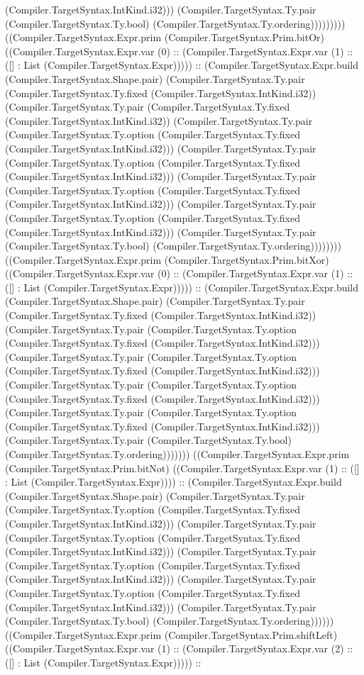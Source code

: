 \documentclass[11pt]{article}
\begin{document}
(Compiler.TargetSyntax.IntKind.i32))) (Compiler.TargetSyntax.Ty.pair (Compiler.TargetSyntax.Ty.bool) (Compiler.TargetSyntax.Ty.ordering))))))))) ((Compiler.TargetSyntax.Expr.prim (Compiler.TargetSyntax.Prim.bitOr) ((Compiler.TargetSyntax.Expr.var (0) :: (Compiler.TargetSyntax.Expr.var (1) :: ([] : List (Compiler.TargetSyntax.Expr))))) :: (Compiler.TargetSyntax.Expr.build (Compiler.TargetSyntax.Shape.pair) (Compiler.TargetSyntax.Ty.pair (Compiler.TargetSyntax.Ty.fixed (Compiler.TargetSyntax.IntKind.i32)) (Compiler.TargetSyntax.Ty.pair (Compiler.TargetSyntax.Ty.fixed (Compiler.TargetSyntax.IntKind.i32)) (Compiler.TargetSyntax.Ty.pair (Compiler.TargetSyntax.Ty.option (Compiler.TargetSyntax.Ty.fixed (Compiler.TargetSyntax.IntKind.i32))) (Compiler.TargetSyntax.Ty.pair (Compiler.TargetSyntax.Ty.option (Compiler.TargetSyntax.Ty.fixed (Compiler.TargetSyntax.IntKind.i32))) (Compiler.TargetSyntax.Ty.pair (Compiler.TargetSyntax.Ty.option (Compiler.TargetSyntax.Ty.fixed (Compiler.TargetSyntax.IntKind.i32))) (Compiler.TargetSyntax.Ty.pair (Compiler.TargetSyntax.Ty.option (Compiler.TargetSyntax.Ty.fixed (Compiler.TargetSyntax.IntKind.i32))) (Compiler.TargetSyntax.Ty.pair (Compiler.TargetSyntax.Ty.bool) (Compiler.TargetSyntax.Ty.ordering)))))))) ((Compiler.TargetSyntax.Expr.prim (Compiler.TargetSyntax.Prim.bitXor) ((Compiler.TargetSyntax.Expr.var (0) :: (Compiler.TargetSyntax.Expr.var (1) :: ([] : List (Compiler.TargetSyntax.Expr))))) :: (Compiler.TargetSyntax.Expr.build (Compiler.TargetSyntax.Shape.pair) (Compiler.TargetSyntax.Ty.pair (Compiler.TargetSyntax.Ty.fixed (Compiler.TargetSyntax.IntKind.i32)) (Compiler.TargetSyntax.Ty.pair (Compiler.TargetSyntax.Ty.option (Compiler.TargetSyntax.Ty.fixed (Compiler.TargetSyntax.IntKind.i32))) (Compiler.TargetSyntax.Ty.pair (Compiler.TargetSyntax.Ty.option (Compiler.TargetSyntax.Ty.fixed (Compiler.TargetSyntax.IntKind.i32))) (Compiler.TargetSyntax.Ty.pair (Compiler.TargetSyntax.Ty.option (Compiler.TargetSyntax.Ty.fixed (Compiler.TargetSyntax.IntKind.i32))) (Compiler.TargetSyntax.Ty.pair (Compiler.TargetSyntax.Ty.option (Compiler.TargetSyntax.Ty.fixed (Compiler.TargetSyntax.IntKind.i32))) (Compiler.TargetSyntax.Ty.pair (Compiler.TargetSyntax.Ty.bool) (Compiler.TargetSyntax.Ty.ordering))))))) ((Compiler.TargetSyntax.Expr.prim (Compiler.TargetSyntax.Prim.bitNot) ((Compiler.TargetSyntax.Expr.var (1) :: ([] : List (Compiler.TargetSyntax.Expr)))) :: (Compiler.TargetSyntax.Expr.build (Compiler.TargetSyntax.Shape.pair) (Compiler.TargetSyntax.Ty.pair (Compiler.TargetSyntax.Ty.option (Compiler.TargetSyntax.Ty.fixed (Compiler.TargetSyntax.IntKind.i32))) (Compiler.TargetSyntax.Ty.pair (Compiler.TargetSyntax.Ty.option (Compiler.TargetSyntax.Ty.fixed (Compiler.TargetSyntax.IntKind.i32))) (Compiler.TargetSyntax.Ty.pair (Compiler.TargetSyntax.Ty.option (Compiler.TargetSyntax.Ty.fixed (Compiler.TargetSyntax.IntKind.i32))) (Compiler.TargetSyntax.Ty.pair (Compiler.TargetSyntax.Ty.option (Compiler.TargetSyntax.Ty.fixed (Compiler.TargetSyntax.IntKind.i32))) (Compiler.TargetSyntax.Ty.pair (Compiler.TargetSyntax.Ty.bool) (Compiler.TargetSyntax.Ty.ordering)))))) ((Compiler.TargetSyntax.Expr.prim (Compiler.TargetSyntax.Prim.shiftLeft) ((Compiler.TargetSyntax.Expr.var (1) :: (Compiler.TargetSyntax.Expr.var (2) :: ([] : List (Compiler.TargetSyntax.Expr))))) :: 
\end{document}
